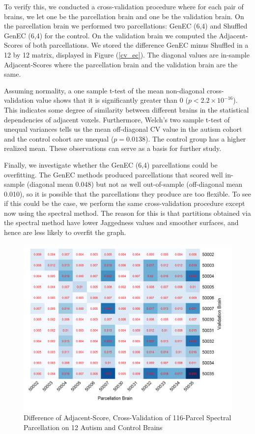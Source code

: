 To verify this, we conducted a cross-validation procedure where
for each pair of brains, we let one be the parcellation brain and one
be the validation brain. On the parcellation brain we performed two
parcellations: GenEC (6,4) and Shuffled GenEC (6,4) for the control.
On the validation brain we computed the Adjacent-Scores of both
parcellations. We stored the difference GenEC minus Shuffled in a
12 by 12 matrix, displayed in Figure (\ref{cv_ec}). The diagonal values
are in-sample Adjacent-Scores where the parcellation brain and the
validation brain are the same.

Assuming normality, a one sample t-test of the mean non-diagonal
cross-validation value shows that it is significantly greater than 0
($p < 2.2 \times 10^{-16}$). This indicates some degree of similarity
between different brains in the statistical dependencies of adjacent
voxels. Furthermore, Welch's two sample t-test of unequal variances
tells us the mean off-diagonal CV value in the autism cohort and the
control cohort are unequal ($p = 0.0138$). The control group has a
higher realized mean. These observations can serve as a basis for
further study.

Finally, we investigate whether the GenEC (6,4) parcellations could be
overfitting. The GenEC methods produced parcellations that scored well
in-sample (diagonal mean 0.048) but not as well out-of-sample
(off-diagonal mean 0.010), so it is possible that the parcellations
they produce are too flexible. To see if this could be the case, we
perform the same cross-validation procedure except now using the
spectral method. The reason for this is that partitions obtained via the
spectral method have lower Jaggedness values and smoother surfaces,
and hence are less likely to overfit the graph.

\begin{figure}
\caption{Difference of Adjacent-Score, Cross-Validation of
116-Parcel Spectral Parcellation on 12 Autism and Control Brains}
\label{cv_sp}
\includegraphics[scale = 1]{figs/8_cv_sp.png}
\end{figure}

